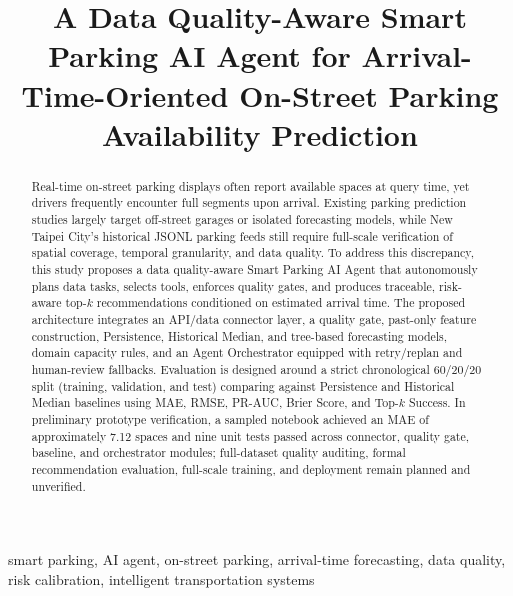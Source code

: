 \documentclass[conference,a4paper]{IEEEtran}
\begin{document}
\title{A Data Quality-Aware Smart Parking AI Agent for Arrival-Time-Oriented On-Street Parking Availability Prediction}

\author{
}

\maketitle

\begin{abstract}
Real-time on-street parking displays often report available spaces at query time, yet drivers frequently encounter full segments upon arrival. Existing parking prediction studies largely target off-street garages or isolated forecasting models, while New Taipei City's historical JSONL parking feeds still require full-scale verification of spatial coverage, temporal granularity, and data quality. To address this discrepancy, this study proposes a data quality-aware Smart Parking AI Agent that autonomously plans data tasks, selects tools, enforces quality gates, and produces traceable, risk-aware top-$k$ recommendations conditioned on estimated arrival time. The proposed architecture integrates an API/data connector layer, a quality gate, past-only feature construction, Persistence, Historical Median, and tree-based forecasting models, domain capacity rules, and an Agent Orchestrator equipped with retry/replan and human-review fallbacks. Evaluation is designed around a strict chronological 60/20/20 split (training, validation, and test) comparing against Persistence and Historical Median baselines using MAE, RMSE, PR-AUC, Brier Score, and Top-$k$ Success. In preliminary prototype verification, a sampled notebook achieved an MAE of approximately 7.12 spaces and nine unit tests passed across connector, quality gate, baseline, and orchestrator modules; full-dataset quality auditing, formal recommendation evaluation, full-scale training, and deployment remain planned and unverified.
\end{abstract}

\begin{IEEEkeywords}
smart parking, AI agent, on-street parking, arrival-time forecasting, data quality, risk calibration, intelligent transportation systems
\end{IEEEkeywords}
\end{document}

